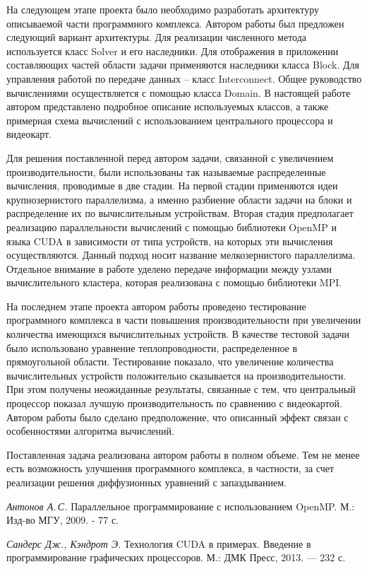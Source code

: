 \documentclass[a4paper, 14pt]{extarticle}
\theoremstyle{definition}
\begin{document}
\par На следующем этапе проекта было необходимо разработать архитектуру описываемой части программного комплекса. Автором работы был предложен следующий вариант архитектуры. Для реализации численного метода используется класс Solver и его наследники. Для отображения в приложении составляющих частей области задачи применяются наследники класса Block. Для управления работой по передаче данных -- класс Interconnect. Общее руководство вычислениями осуществляется с помощью класса Domain. В настоящей работе автором представлено подробное описание используемых классов, а также примерная схема вычислений с использованием центрального процессора и видеокарт.

\par Для решения поставленной перед автором задачи, связанной с увеличением производительности, были использованы так называемые распределенные вычисления, проводимые в две стадии. На первой стадии применяются идеи крупнозернистого параллелизма, а именно разбиение области задачи на блоки и распределение их по вычислительным устройствам. Вторая стадия предполагает реализацию параллельности вычислений с помощью библиотеки OpenMP и языка CUDA в зависимости от типа устройств, на которых эти вычисления осуществляются. Данный подход носит название мелкозернистого параллелизма. Отдельное внимание в работе уделено передаче информации между узлами вычислительного кластера, которая реализована с помощью библиотеки MPI.

\par На последнем этапе проекта автором работы проведено тестирование программного комплекса в части повышения производительности при увеличении количества имеющихся вычислительных устройств. В качестве тестовой задачи было использовано уравнение теплопроводности, распределенное в прямоугольной области. Тестирование показало, что увеличение количества вычислительных устройств положительно сказывается на производительности. При этом получены неожиданные результаты, связанные с тем, что центральный процессор показал лучшую производительность по сравнению с видеокартой. Автором работы было сделано предположение, что описанный эффект связан с особенностями алгоритма вычислений.

\par Поставленная задача реализована автором работы в полном объеме. Тем не менее есть возможность улучшения программного комплекса, в частности, за счет реализации решения диффузионных уравнений с запаздыванием.






\begin{thebibliography}{99}

\textit{Антонов А.\,С. } 
{Параллельное программирование с использованием OpenMP. 
М.: Изд-во МГУ, 2009. - 77 с. } 

\textit{Сандерс Дж., Кэндрот Э. } 
{Технология CUDA в примерах. Введение в программирование графических процессоров. 
М.: ДМК Пресс, 2013. — 232 с. } 

\end{thebibliography}
\end{document}
